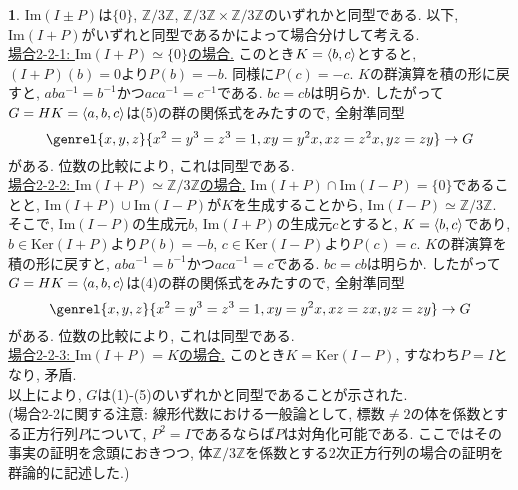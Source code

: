 \documentclass{article}
\theoremstyle{definition}
\newtheorem{ans}{}
\numberwithin{ans}{subsection}
\newcommand{\Z}[1]{\mathbb{Z}/#1\mathbb{Z}}
\newcommand{\Ker}[1]{\mathrm{Ker}(#1)}
\DeclarePairedDelimiter{\gen}{\langle}{\rangle}
\begin{document}
\begin{ans}
  $\mathrm{Im}(I \pm P)$は$\{ 0 \}$, $\Z{3}$, $\Z{3} \times \Z{3}$のいずれかと同型である.
  以下, $\mathrm{Im}(I + P)$がいずれと同型であるかによって場合分けして考える.\\

  \underline{場合2-2-1: $\mathrm{Im}(I + P) \simeq \{ 0 \}$の場合.}
  このとき$K = \gen{b, c}$とすると, $(I + P)(b) = 0$より$P(b) = -b$.
  同様に$P(c) = -c$.
  $K$の群演算を積の形に戻すと, $aba^{-1} = b^{-1}$かつ$aca^{-1} = c^{-1}$である.
  $bc = cb$は明らか.
  したがって$G = HK = \gen{a, b, c}$は(5)の群の関係式をみたすので, 全射準同型
  \[
    \genrel{x, y, z}{x^2 = y^3 = z^3 = 1, xy = y^2x, xz = z^2x, yz = zy} \rightarrow G
  \]
  がある. 位数の比較により, これは同型である.\\

  \underline{場合2-2-2: $\mathrm{Im}(I + P) \simeq \Z{3}$の場合.}
  $\mathrm{Im}(I + P) \cap \mathrm{Im}(I - P) = \{ 0 \}$であることと,
  $\mathrm{Im}(I + P) \cup \mathrm{Im}(I - P)$が$K$を生成することから, $\mathrm{Im}(I - P) \simeq \Z{3}$.
  そこで, $\mathrm{Im}(I - P)$の生成元$b$, $\mathrm{Im}(I + P)$の生成元$c$とすると, $K = \gen{b, c}$であり,
  $b \in \Ker{I + P}$より$P(b) = -b$, $c \in \Ker{I - P}$より$P(c) = c$.
  $K$の群演算を積の形に戻すと, $aba^{-1} = b^{-1}$かつ$aca^{-1} = c$である.
  $bc = cb$は明らか.
  したがって$G = HK = \gen{a, b, c}$は(4)の群の関係式をみたすので, 全射準同型
  \[
    \genrel{x, y, z}{x^2 = y^3 = z^3 = 1, xy = y^2x, xz = zx, yz = zy} \rightarrow G
  \]
  がある. 位数の比較により, これは同型である.\\

  \underline{場合2-2-3: $\mathrm{Im}(I + P) = K$の場合.}
  このとき$K = \Ker{I - P}$, すなわち$P = I$となり, 矛盾.\\

  以上により, $G$は(1)-(5)のいずれかと同型であることが示された.\\

  (場合2-2に関する注意: 線形代数における一般論として, 標数$\neq 2$の体を係数とする正方行列$P$について,
  $P^2 = I$であるならば$P$は対角化可能である.
  ここではその事実の証明を念頭におきつつ, 体$\Z{3}$を係数とする$2$次正方行列の場合の証明を群論的に記述した.)
\end{ans}
\end{document}
